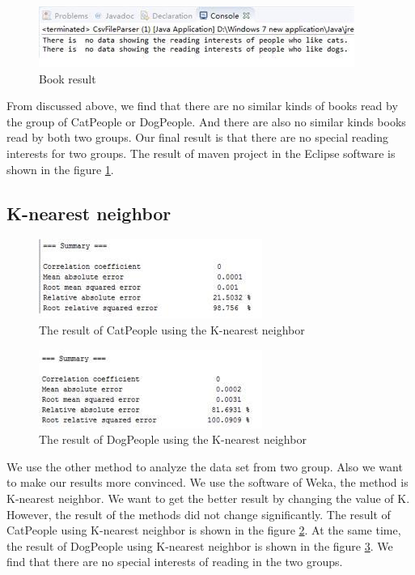 \documentclass[12pt]{article}
\begin{document}
\begin{figure}[h]
  \centering
  \includegraphics[width=0.7\linewidth]{../BookInformation/result.jpg}
  \caption{Book result}
  \label{fig:bookres}
\end{figure}

From discussed above, we find that there are no similar kinds of books read by the group of CatPeople or DogPeople. And there are also no similar kinds books read by both two groups. Our final result is that there are no special reading interests for two groups. The result of maven project in the Eclipse software is shown in the figure \ref{fig:bookres}.

\subsection{K-nearest neighbor}

\begin{figure}[h]
  \centering
  \includegraphics[width=0.7\linewidth]{../BookInformation/k-cat.jpg}
  \caption{The result of CatPeople using the  K-nearest neighbor}
  \label{fig:kcat}
\end{figure}

\begin{figure}[h]
  \centering
  \includegraphics[width=0.7\linewidth]{../BookInformation/k-dog.jpg}
  \caption{The result of DogPeople using the  K-nearest neighbor}
  \label{fig:kdog}
\end{figure}

We use the other method to analyze the data set from two group. Also we want to  make our results more convinced. We use the software of  Weka, the method is K-nearest neighbor.  We want to get the better result by changing the value of K. However, the result of the methods did not change significantly. The result of CatPeople using K-nearest neighbor is shown in the figure \ref{fig:kcat}. At the same time, the result of DogPeople using K-nearest neighbor is shown in the figure \ref{fig:kdog}. We find that there are no special interests of reading in the two groups.
\end{document}
